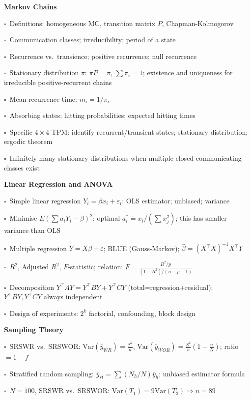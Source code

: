 \documentclass[11pt,a4paper]{article}
\newcommand{\chk}{\textcolor{rulegray}{$\square$}\ }
\begin{document}
\begin{subtopics}
  \item \textbf{Markov Chains}
  \begin{subtopics}
    \item \chk Definitions: homogeneous MC, transition matrix $P$, Chapman-Kolmogorov
    \item \chk Communication classes; irreducibility; period of a state
    \item \chk Recurrence vs.\ transience; positive recurrence; null recurrence
    \item \chk Stationary distribution $\pi$: $\pi P=\pi$, $\sum\pi_i=1$; existence and uniqueness for irreducible positive-recurrent chains
    \item \chk Mean recurrence time: $m_i=1/\pi_i$
    \item \chk Absorbing states; hitting probabilities; expected hitting times
    \item \chk Specific $4\times 4$ TPM: identify recurrent/transient states; stationary distribution; ergodic theorem
    \item \chk Infinitely many stationary distributions when multiple closed communicating classes exist
  \end{subtopics}

  \item \textbf{Linear Regression and ANOVA}
  \begin{subtopics}
    \item \chk Simple linear regression $Y_i=\beta x_i+\varepsilon_i$: OLS estimator; unbiased; variance
    \item \chk Minimise $E(\sum a_i Y_i-\beta)^2$: optimal $a_i^*=x_i/(\sum x_j^2)$; this has smaller variance than OLS
    \item \chk Multiple regression $Y=X\beta+\varepsilon$; BLUE (Gauss-Markov); $\hat\beta=(X^\top X)^{-1}X^\top Y$
    \item \chk $R^2$, Adjusted $R^2$, $F$-statistic; relation: $F=\frac{R^2/p}{(1-R^2)/(n-p-1)}$
    \item \chk Decomposition $Y^\top AY=Y^\top BY+Y^\top CY$ (total=regression+residual); $Y^\top BY,Y^\top CY$ always independent
    \item \chk Design of experiments: $2^k$ factorial, confounding, block design
  \end{subtopics}

  \item \textbf{Sampling Theory}
  \begin{subtopics}
    \item \chk SRSWR vs.\ SRSWOR: $\mathrm{Var}(\bar y_{WR})=\frac{S^2}{n}$, $\mathrm{Var}(\bar y_{WOR})=\frac{S^2}{n}(1-\frac{n}{N})$; ratio $=1-f$
    \item \chk Stratified random sampling: $\bar y_{st}=\sum(N_h/N)\bar y_h$; unbiased estimator formula
    \item \chk $N=100$, SRSWR vs.\ SRSWOR: $\mathrm{Var}(T_1)=9\mathrm{Var}(T_2) \Rightarrow n=89$
  \end{subtopics}


\end{subtopics}
\end{document}
